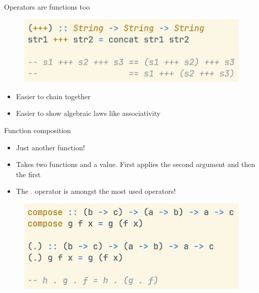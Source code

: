 \documentclass[pdf]{beamer}
\newcommand{\code}[1]{\textcolor{Red}{\textsf{#1}}}
\begin{document}
\begin{frame}{Operators are functions too}
  \begin{figure}[H]
    \centering
    \includegraphics[width=\textwidth]{concat-op}
  \end{figure}
  \begin{itemize}
  \item Easier to chain together
  \item Easier to show algebraic laws like associativity
  \end{itemize}
\end{frame}

\begin{frame}{Function composition}
  \begin{itemize}
  \item Just another function!
  \item Takes two functions and a value. First applies the second argument and then the first
  \item The \code{.} operator is amongst the most used operators!
  \end{itemize}

  \begin{figure}[H]
    \includegraphics[width=\textwidth]{compose}
  \end{figure}
\end{frame}
\end{document}
